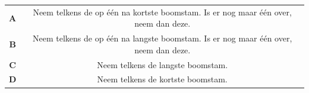 \documentclass[12pt, a4paper]{article}
\begin{document}
\begin{minipage}{\textwidth}
			\begin{table}[H]
				\centering
				\begin{tabular}{|c|c|}
					\hline
					\textbf{A} & Neem telkens de op \'e\'en na kortste boomstam. Is er nog maar \'e\'en over, neem dan deze. \\
					\textbf{B} & Neem telkens de op \'e\'en na langste boomstam. Is er nog maar \'e\'en over, neem dan deze. \\ 
					\textbf{C} & Neem telkens de langste boomstam. \\ 
					\textbf{D} & Neem telkens de kortste boomstam. \\
					\hline 
				\end{tabular}
			\end{table}
	\end{minipage} \\ \\
	
\end{document}
